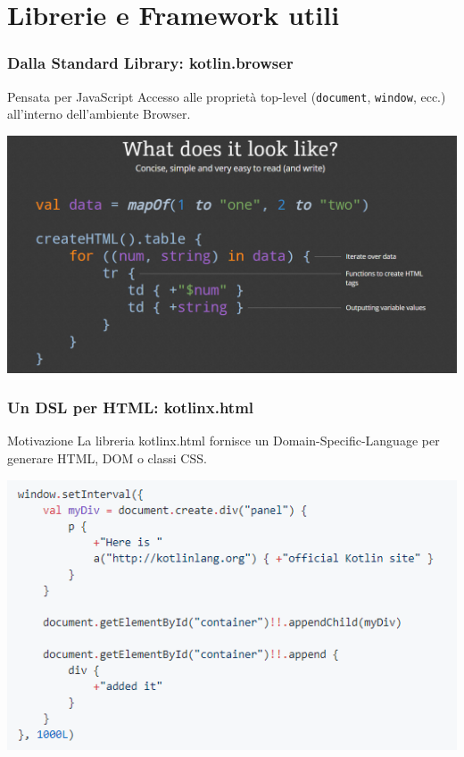    \section{Librerie e Framework utili}
    \begin{frame}
      \frametitle{Dalla Standard Library: \textbf{kotlin.browser}}
      \begin{block}{Pensata per JavaScript}
        Accesso alle proprietà top-level (\texttt{document}, \texttt{window}, ecc.) all'interno dell'ambiente Browser.
      \end{block}
      \begin{center}
        \includegraphics[scale=0.33]{KotlinHtmlX}
      \end{center}
    \end{frame}

    \begin{frame}
      \frametitle{Un DSL per HTML: \textbf{kotlinx.html}}
      \begin{block}{Motivazione}
        La libreria kotlinx.html fornisce un Domain-Specific-Language per \alert{generare} HTML, DOM o classi CSS.
      \end{block}
      \begin{center}
        \includegraphics[scale=0.67]{KotlinxHtmlEx}
      \end{center}
    \end{frame}

